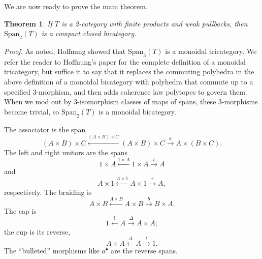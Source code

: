 \documentclass[12pt,twoside,openright]{report}
\newtheorem{thm}{Theorem}
\newcommand{\Span}{\mbox{Span}}
\newtheorem{cor}[thm]{Corollary}
\begin{document}
%

We are now ready to prove the main theorem.

\begin{thm}
  \label{Span2}
  If $T$ is a 2-category with finite products and weak pullbacks, then $\Span_2(T)$ is a compact closed bicategory.
\end{thm}
{\em Proof.} As noted, Hoffnung \cite{Hoffnung} showed that $\Span_3(T)$
is a monoidal tricategory.  We refer the reader to Hoffnung's paper for the complete definition of a monoidal tricategory, but suffice it to say that it replaces the commuting polyhedra in the above definition of a monoidal bicategory with polyhedra that commute up to a specified 3-morphism, and then adds coherence law polytopes to govern them.  When we mod out by 3-isomorphism classes of maps of spans, these 3-morphisms become trivial, so $\Span_2(T)$ is a monoidal bicategory.

The associator is the span $$(A\times B)\times C \stackrel{(A\times B)\times C}{\leftarrow} (A\times B)\times C \stackrel{a}{\to} A\times (B\times C).$$  The left and right unitors are the spans $$1\times A \stackrel{1\times A}{\leftarrow} 1\times A \stackrel{l}{\to} A$$ and $$A\times 1 \stackrel{A\times 1}{\leftarrow} A\times 1 \stackrel{r}{\to} A,$$ respectively.  The braiding is $$A\times B \stackrel{A\times B}{\leftarrow} A\times B \stackrel{b}{\to} B\times A.$$   The cap is $$1 \stackrel{!}{\leftarrow} A \stackrel{\Delta}{\to} A\times A;$$ the cup is its reverse, $$A\times A \stackrel{\Delta}{\leftarrow} A \stackrel{!}{\to} 1.$$  The ``bulleted'' morphisms like $a^\bullet$ are the reverse spans.
\end{document}
